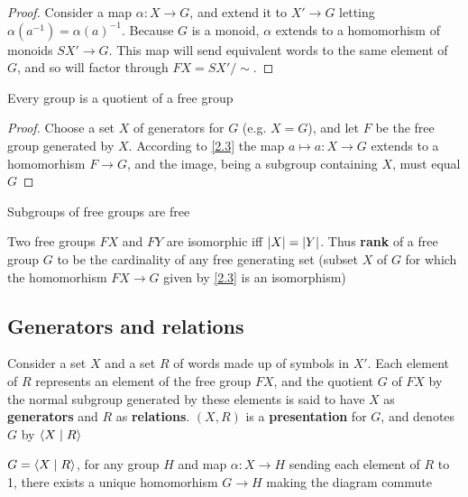 \documentclass[11pt]{article}
\begin{document}
\begin{proof}
Consider a map \(\alpha:X\to G\), and extend it to \(X'\to G\) letting \(\alpha(a^{-1})=\alpha(a)^{-1}\).
Because \(G\) is a monoid, \(\alpha\) extends to a homomorhism of monoids \(SX'\to G\). This map will send
equivalent words to the same element of \(G\), and so will factor through \(FX=SX'/\sim\).
\end{proof}

\begin{corollary}[]
Every group is a quotient of a free group
\end{corollary}

\begin{proof}
Choose a set \(X\) of generators for \(G\) (e.g. \(X=G\)), and let \(F\) be the free group
generated by \(X\). According to \ref{2.3} the map \(a\mapsto a:X\to G\)  extends to a
homomorhism \(F\to G\), and the image, being a subgroup containing \(X\), must equal \(G\)
\end{proof}

\begin{theorem}
Subgroups of free groups are free
\end{theorem}

Two free groups \(FX\) and \(FY\) are isomorphic iff \(\abs{X}=\abs{Y}\). Thus \textbf{rank} of a free
group \(G\) to be the cardinality of any free generating set (subset \(X\) of \(G\) for which
the homomorhism \(FX\to G\) given by \ref{2.3} is an isomorphism)
\subsection{Generators and relations}
\label{sec:org80308f2}
Consider a set \(X\) and a set \(R\) of words made up of symbols in \(X'\). Each element
of \(R\) represents an element of the free group \(FX\), and the quotient \(G\) of \(FX\) by the
normal subgroup generated by these elements is said to have \(X\) as \textbf{generators} and \(R\) as
\textbf{relations}. \((X,R)\) is a \textbf{presentation} for \(G\), and denotes \(G\) by \(\langle X\mid R\rangle\)

\begin{proposition}[]
\(G=\langle X\mid R\rangle\), for any group \(H\) and map \(\alpha:X\to H\) sending each element of \(R\) to 1, there
exists a unique homomorhism \(G\to H\) making the diagram commute
\begin{center}\end{center}
\end{proposition}
\end{document}
